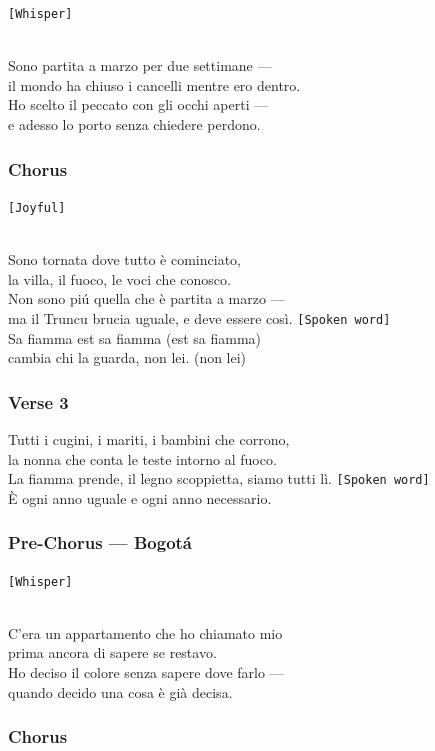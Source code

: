 \texttt{{[}Whisper{]}}\strut \\
Sono partita a marzo per due settimane ---\\
il mondo ha chiuso i cancelli mentre ero dentro.\\
Ho scelto il peccato con gli occhi aperti ---\\
e adesso lo porto senza chiedere perdono.

\subsubsection{Chorus}\label{chorus-40}

\texttt{{[}Joyful{]}}\strut \\
Sono tornata dove tutto è cominciato,\\
la villa, il fuoco, le voci che conosco.\\
Non sono piú quella che è partita a marzo ---\\
ma il Truncu brucia uguale, e deve essere così.
\texttt{{[}Spoken\ word{]}}\\
Sa fiamma est sa fiamma (est sa fiamma)\\
cambia chi la guarda, non lei. (non lei)

\subsubsection{Verse 3}\label{verse-3-9}

Tutti i cugini, i mariti, i bambini che corrono,\\
la nonna che conta le teste intorno al fuoco.\\
La fiamma prende, il legno scoppietta, siamo tutti lì.
\texttt{{[}Spoken\ word{]}}\\
È ogni anno uguale e ogni anno necessario.

\subsubsection{Pre-Chorus --- Bogotá}\label{pre-chorus-bogotuxe1}

\texttt{{[}Whisper{]}}\strut \\
C'era un appartamento che ho chiamato mio\\
prima ancora di sapere se restavo.\\
Ho deciso il colore senza sapere dove farlo ---\\
quando decido una cosa è già decisa.

\subsubsection{Chorus}\label{chorus-41}


